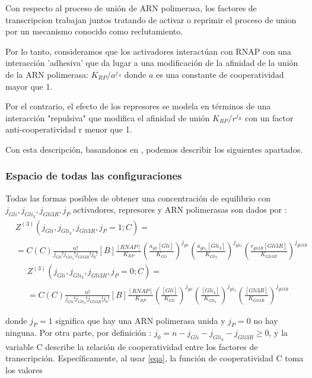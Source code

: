 Con respecto al proceso de unión de ARN polimerasa, los factores de transcripcion trabajan juntos tratando de activar o reprimir el proceso de union por un mecanismo conocido como reclutamiento. 

Por lo tanto, consideramos que los activadores interactúan con RNAP con
una interacción 'adhesiva' que da lugar a una modificación de la afinidad de la unión de la ARN polimerasa: $K_{RP} / a^{j_A}$ donde $a$ es una constante de cooperatividad mayor que 1.
 
Por el contrario, el efecto de los represores se modela en términos de una interacción "repulsiva" que modifica el afinidad de unión  $K_{RP} / r^{j_R}$ con un factor anti-cooperatividad r menor que 1.

Con esta descripción, basandonos en \cite{cambon1,sdas}, podemos describir los siguientes apartados.

\subsubsection{Espacio de todas las configuraciones}
Todas las formas posibles de obtener una concentración de equilibrio con $j_{Gli}, j_{Gli_3}, j_{Gli3R},j_P$ activadores, represores y ARN polimerasas son dados por :
\begin{equation}
\begin{split}
&Z^{(3)}(j_{Gli}, j_{Gli_3}, j_{Gli3R},j_P=1;C)=\\&=\textit{C}(C)\frac{n!}{j_{Gli}! j_{Gli_3}! j_{Gli3R}!j_0!}[B]\frac{[RNAP]}{K_{RP}}
\left(\frac{a_{gli}[Gli]}{K_{Gli}}\right)^{j_{gli}}
\left(\frac{a_{gli_3}[Gli_3]}{K_{Gli_3}}\right)^{j_{gli_3}}
\left(\frac{r_{gli3R}[Gli3R]}{K_{Gli3R}}\right)^{j_{gli3R}}
\end{split}
\end{equation}
\begin{equation}
\begin{split}
&Z^{(3)}(j_{Gli}, j_{Gli_3}, j_{Gli3R},j_P=0;C)=\\&=\textit{C}(C)\frac{n!}{j_{Gli}! j_{Gli_3}! j_{Gli3R}!j_0!}[B]\frac{[RNAP]}{K_{RP}}
\left(\frac{[Gli]}{K_{Gli}}\right)^{j_{gli}}
\left(\frac{[Gli_3]}{K_{Gli_3}}\right)^{j_{gli_3}}
\left(\frac{[Gli3R]}{K_{Gli3R}}\right)^{j_{gli3R}}
\end{split}
\end{equation}

donde $j_P = 1$ significa que hay una ARN polimerasa unida y $j_P = 0$ no hay ninguna. Por otra parte, por definición :
$j_0 = n - j_{Gli}- j_{Gli_3}- j_{Gli3R} \geq 0$, y la variable C describe la relación de cooperatividad entre los factores de transcripción. Específicamente, al usar \ref{eqa}, la función de cooperatividad C toma los valores

